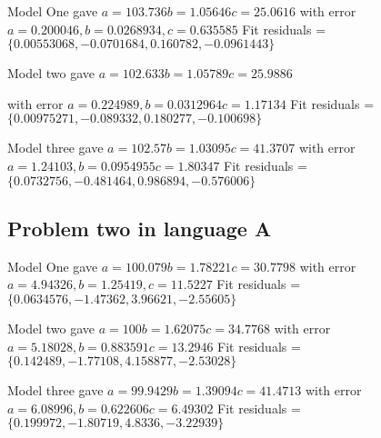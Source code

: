 Model One gave
$a = 103.736 b = 1.05646 c = 25.0616$
with error $a = 0.200046, b = 0.0268934, c = 0.635585$
Fit residuals = $\{0.00553068, -0.0701684, 0.160782, -0.0961443\}$

Model two gave
$a = 102.633 b = 1.05789 c = 25.9886$

with error $a = 0.224989, b = 0.0312964 c = 1.17134$
Fit residuals = $\{0.00975271, -0.089332, 0.180277, -0.100698\}$

Model three gave
$a = 102.57 b = 1.03095 c = 41.3707$ with error
$a = 1.24103, b = 0.0954955 c = 1.80347$
Fit residuals = $\{0.0732756, -0.481464, 0.986894, -0.576006\}$

\subsection{Problem two in language A} \label{subsecP2LA}

Model One gave
$a = 100.079 b = 1.78221 c = 30.7798$
with error $a = 4.94326, b = 1.25419, c = 11.5227$
Fit residuals = $\{0.0634576, -1.47362, 3.96621, -2.55605\}$

Model two gave
$a = 100 b = 1.62075 c = 34.7768$
with error $a = 5.18028, b = 0.883591 c = 13.2946$
Fit residuals = $\{0.142489, -1.77108, 4.158877, -2.53028\}$

Model three gave
$a = 99.9429 b = 1.39094 c = 41.4713$ with error
$a = 6.08996, b = 0.622606 c = 6.49302$
Fit residuals = $\{0.199972, -1.80719, 4.8336, -3.22939\}$

